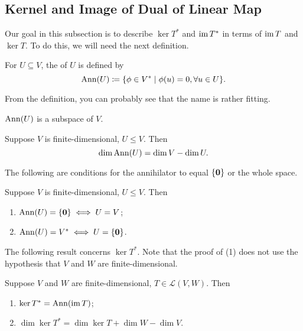 \subsection{Kernel and Image of Dual of Linear Map}
Our goal in this subsection is to describe $\ker T^*$ and $\operatorname{im} T^*$ in terms of $\operatorname{im} T$ and $\ker T$. To do this, we will need the next definition.

\begin{definition}[Annihilator]
For $U\subseteq V$, the  of $U$ is defined by
\[\operatorname{Ann}(U)\coloneqq\{\phi\in V^*\mid\phi(u)=0,\forall u\in U\}.\]
\end{definition}

From the definition, you can probably see that the name is rather fitting.

\begin{proposition}
$\operatorname{Ann}(U)$ is a subspace of $V$.
\end{proposition}

\begin{proposition}
Suppose $V$ is finite-dimensional, $U\le V$. Then
\[\dim\operatorname{Ann}(U)=\dim V-\dim U.\]
\end{proposition}

The following are conditions for the annihilator to equal $\{\vb{0}\}$ or the whole space.

\begin{proposition}
Suppose $V$ is finite-dimensional, $U\le V$. Then
\begin{enumerate}[label=(\roman*)]
\item $\operatorname{Ann}(U)=\{\vb{0}\}\iff U=V$;
\item $\operatorname{Ann}(U)=V^*\iff U=\{\vb{0}\}$.
\end{enumerate}
\end{proposition}

The following result concerns $\ker T^*$. Note that the proof of (1) does not use the hypothesis that $V$ and $W$ are finite-dimensional.

\begin{proposition}
Suppose $V$ and $W$ are finite-dimensional, $T\in\mathcal{L}(V,W)$. Then
\begin{enumerate}[label=(\roman*)]
\item $\ker T^*=\operatorname{Ann}(\operatorname{im} T)$;
\item $\dim\ker T^*=\dim\ker T+\dim W-\dim V$.
\end{enumerate}
\end{proposition}

